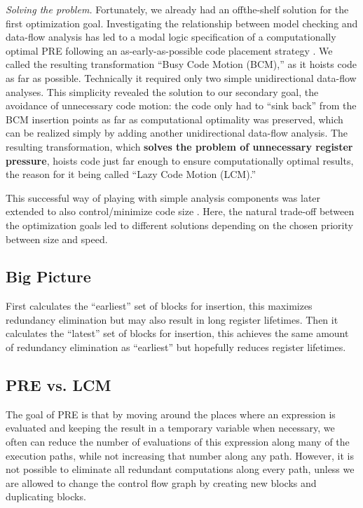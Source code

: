 \textit{Solving the problem.} Fortunately, we already had an offthe-shelf solution for the first optimization goal. Investigating the relationship between model checking and data-flow
analysis has led to a modal logic specification of a computationally optimal PRE following an as-early-as-possible code
placement strategy \cite{steffen1991data}. We called the resulting transformation “Busy Code Motion (BCM),” as it hoists code as
far as possible. Technically it required only two simple unidirectional data-flow analyses. This simplicity revealed the
solution to our secondary goal, the avoidance of unnecessary code motion: the code only had to “sink back” from
the BCM insertion points as far as computational optimality was preserved, which can be realized simply by adding another
unidirectional data-flow analysis. The resulting transformation, which \textbf{solves the problem of unnecessary register
	pressure}, hoists code just far enough to ensure computationally optimal results, the reason for it being called “Lazy
Code Motion (LCM).”

This successful way of playing with simple analysis components was later extended to also control/minimize code
size \cite{ruthing2000sparse}. Here, the natural trade-off between the optimization goals led to different solutions depending on the chosen
priority between size and speed.


\subsection{Big Picture}

First calculates the “earliest” set of blocks for insertion, this maximizes redundancy elimination but may also result in long register lifetimes.
Then it calculates the “latest” set of blocks for insertion, this achieves the same amount of redundancy elimination as “earliest” but hopefully reduces register lifetimes.\cite{293S08PR25:online,Microsof86:online}


\subsection{PRE vs. LCM}


The goal of PRE is that by {\color{red}moving around} the places where an expression is
evaluated and keeping the result in a temporary variable when
necessary, we often can {\color{red}reduce the number of evaluations} of this
expression along many of the execution paths, {\color{red}while not
		increasing that number along any path.} However, it is {\color{red}not} possible to eliminate all redundant computations along
every path, unless we are allowed to {\color{red}change the control flow
		graph} by {\color{red}creating new blocks} and {\color{red}duplicating blocks.}

